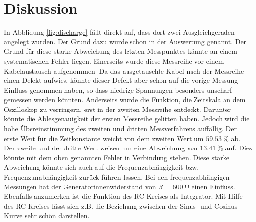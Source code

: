 \section{Diskussion}
\label{sec:Diskussion}
In Abblidung \ref{fig:discharge} fällt direkt auf, dass dort zwei Ausgleichgeraden angelegt wurden. Der Grund dazu wurde schon in der Auswertung genannt.
Der Grund für diese starke Abweichung des letzten Messpunktes könnte an einem systematischen Fehler liegen. Einerseits wurde diese Messreihe vor einem Kabelaustausch
aufgenommen. Da das ausgetauschte Kabel nach der Messreihe einen Defekt aufwies, könnte dieser Defekt aber schon auf die vorige Messung Einfluss genommen haben, so dass
niedrige Spannungen besonders unscharf gemessen werden könnten.
Anderseits wurde die Funktion, die Zeitskala an dem Oszilloskop zu verringern, erst in der zweiten Messreihe entdeckt. Darunter könnte die Ablesgenauigkeit der ersten Messreihe
gelitten haben.
Jedoch wird die hohe Übereinstimmung des zweiten und dritten Messverfahrens auffällig. Der erste Wert für die Zeitkonstante weicht von dem zweiten Wert
um $\SI{59.53}{\percent}$ ab. Der zweite und der dritte Wert weisen nur eine Abweichung von $\SI{13.41}{\percent}$ auf. Dies könnte mit dem oben genannten
Fehler in Verbindung stehen.
Diese starke Abweichung könnte sich auch auf die Frequenzabhängigkeit bzw. Frequenzunabhängigkeit zurück führen lassen. 
Bei den frequenzabhängigen Messungen hat der Generatorinnenwiderstand von $R = \SI{600}{\ohm}$ einen Einfluss.
Ebenfalls anzumerken ist die Funktion des RC-Kreises als Integrator. 
Mit Hilfe des RC-Kreises lässt sich z.B. die Beziehung zwischen der Sinus- und Cosinus-Kurve sehr schön darstellen.